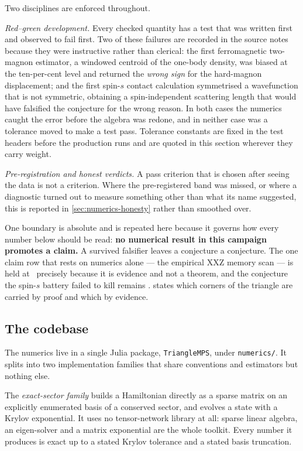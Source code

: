 Two disciplines are enforced throughout.

\emph{Red--green development.} Every checked quantity has a test that was
written first and observed to fail first. Two of these failures are recorded
in the source notes because they were instructive rather than clerical: the
first ferromagnetic two-magnon estimator, a windowed centroid of the one-body
density, was biased at the ten-per-cent level and returned the \emph{wrong
sign} for the hard-magnon displacement; and the first spin-$s$ contact
calculation symmetrised a wavefunction that is not symmetric, obtaining a
spin-independent scattering length that would have falsified the conjecture
for the wrong reason. In both cases the numerics caught the error before the
algebra was redone, and in neither case was a tolerance moved to make a test
pass. Tolerance constants are fixed in the test headers before the production
runs and are quoted in this section wherever they carry weight.

\emph{Pre-registration and honest verdicts.} A pass criterion that is chosen
after seeing the data is not a criterion. Where the pre-registered band was
missed, or where a diagnostic turned out to measure something other than what
its name suggested, this is reported in \cref{sec:numerics-honesty} rather
than smoothed over.

One boundary is absolute and is repeated here because it governs how every
number below should be read: \textbf{no numerical result in this campaign
promotes a claim.} A survived falsifier leaves a conjecture a conjecture. The
one claim row that rests on numerics alone --- the empirical XXZ memory scan
--- is held at \statusSketch\ precisely because it is evidence and not a
theorem, and the conjecture the spin-$s$ battery failed to kill remains
\statusConjecture.  states which corners of the
triangle are carried by proof and which by evidence.

\subsection{The codebase}\label{sec:numerics-code}

The numerics live in a single Julia package, \texttt{TriangleMPS}, under
\texttt{numerics/\allowbreak{}}. It splits into two implementation families that share
conventions and estimators but nothing else.

The \emph{exact-sector family} builds a Hamiltonian directly as a sparse
matrix on an explicitly enumerated basis of a conserved sector, and evolves a
state with a Krylov exponential. It uses no tensor-network library at all:
sparse linear algebra, an eigen-solver and a matrix exponential are the whole
toolkit. Every number it produces is exact up to a stated Krylov tolerance and
a stated basis truncation.

